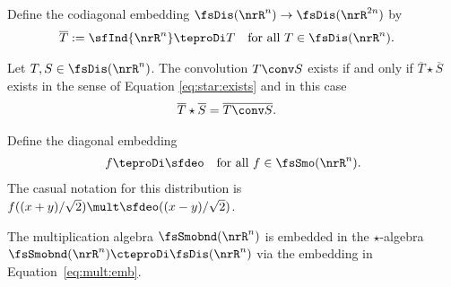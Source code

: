 Define the codiagonal embedding $ \fsDis( \nrR^n ) \to \fsDis( \nrR^{2n} ) $ by
\begin{align}
    \overline{T}
    &:=
    \sfInd{\nrR^n} \teproDi T
    &&\text{for all $ T \in \fsDis( \nrR^n ) $.}
    \label{eq:codiagemb}
\end{align}

\begin{lemma}
    Let $ T, S \in \fsDis( \nrR^n ) $.
    The convolution $ T \conv S $ exists if and only if
    $ \overline{T} \star \overline{S} $ exists
    in the sense of Equation \eqref{eq:star:exists}
    and in this case
    \begin{align}
        \overline{ T } \star \overline{ S }
        &=
        \overline{ T \conv S }
        .
    \end{align}
\end{lemma}


Define the diagonal embedding
\begin{align}
    f \teproDi \sfdeo
    &&\text{for all $ f \in \fsSmo( \nrR^n ) $.}
    \label{eq:mult:emb}
\end{align}
The casual notation for this distribution
is $ f( (x + y)/\sqrt{2} ) \mult \sfdeo( (x - y)/\sqrt{2} ) $.

\begin{remark}
    The multiplication algebra $ \fsSmobnd( \nrR^n ) $
    is embedded in the $\star$-algebra $ \fsSmobnd(\nrR^n) \cteproDi \fsDis(\nrR^n) $
    via the embedding in Equation~\eqref{eq:mult:emb}.
\end{remark}